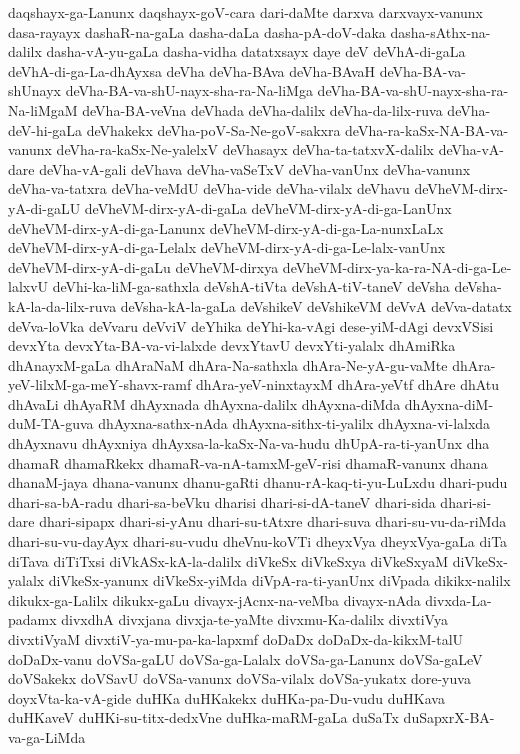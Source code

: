 {daqshayx-ga-Lanunx
daqshayx-goV-cara
dari-daMte
darxva
darxvayx-vanunx
dasa-rayayx
dashaR-na-gaLa
dasha-daLa
dasha-pA-doV-daka
dasha-sAthx-na-dalilx
dasha-vA-yu-gaLa
dasha-vidha
datatxsayx
daye
deV
deVhA-di-gaLa
deVhA-di-ga-La-dhAyxsa
deVha
deVha-BAva
deVha-BAvaH
deVha-BA-va-shUnayx
deVha-BA-va-shU-nayx-sha-ra-Na-liMga
deVha-BA-va-shU-nayx-sha-ra-Na-liMgaM
deVha-BA-veVna
deVhada
deVha-dalilx
deVha-da-lilx-ruva
deVha-deV-hi-gaLa
deVhakekx
deVha-poV-Sa-Ne-goV-sakxra
deVha-ra-kaSx-NA-BA-va-vanunx
deVha-ra-kaSx-Ne-yalelxV
deVhasayx
deVha-ta-tatxvX-dalilx
deVha-vA-dare
deVha-vA-gali
deVhava
deVha-vaSeTxV
deVha-vanUnx
deVha-vanunx
deVha-va-tatxra
deVha-veMdU
deVha-vide
deVha-vilalx
deVhavu
deVheVM-dirx-yA-di-gaLU
deVheVM-dirx-yA-di-gaLa
deVheVM-dirx-yA-di-ga-LanUnx
deVheVM-dirx-yA-di-ga-Lanunx
deVheVM-dirx-yA-di-ga-La-nunxLaLx
deVheVM-dirx-yA-di-ga-Lelalx
deVheVM-dirx-yA-di-ga-Le-lalx-vanUnx
deVheVM-dirx-yA-di-gaLu
deVheVM-dirxya
deVheVM-dirx-ya-ka-ra-NA-di-ga-Le-lalxvU
deVhi-ka-liM-ga-sathxla
deVshA-tiVta
deVshA-tiV-taneV
deVsha
deVsha-kA-la-da-lilx-ruva
deVsha-kA-la-gaLa
deVshikeV
deVshikeVM
deVvA
deVva-datatx
deVva-loVka
deVvaru
deVviV
deYhika
deYhi-ka-vAgi
dese-yiM-dAgi
devxVSisi
devxYta
devxYta-BA-va-vi-lalxde
devxYtavU
devxYti-yalalx
dhAmiRka
dhAnayxM-gaLa
dhAraNaM
dhAra-Na-sathxla
dhAra-Ne-yA-gu-vaMte
dhAra-yeV-lilxM-ga-meY-shavx-ramf
dhAra-yeV-ninxtayxM
dhAra-yeVtf
dhAre
dhAtu
dhAvaLi
dhAyaRM
dhAyxnada
dhAyxna-dalilx
dhAyxna-diMda
dhAyxna-diM-duM-TA-guva
dhAyxna-sathx-nAda
dhAyxna-sithx-ti-yalilx
dhAyxna-vi-lalxda
dhAyxnavu
dhAyxniya
dhAyxsa-la-kaSx-Na-va-hudu
dhUpA-ra-ti-yanUnx
dha
dhamaR
dhamaRkekx
dhamaR-va-nA-tamxM-geV-risi
dhamaR-vanunx
dhana
dhanaM-jaya
dhana-vanunx
dhanu-gaRti
dhanu-rA-kaq-ti-yu-LuLxdu
dhari-pudu
dhari-sa-bA-radu
dhari-sa-beVku
dharisi
dhari-si-dA-taneV
dhari-sida
dhari-si-dare
dhari-sipapx
dhari-si-yAnu
dhari-su-tAtxre
dhari-suva
dhari-su-vu-da-riMda
dhari-su-vu-dayAyx
dhari-su-vudu
dheVnu-koVTi
dheyxVya
dheyxVya-gaLa
diTa
diTava
diTiTxsi
diVkASx-kA-la-dalilx
diVkeSx
diVkeSxya
diVkeSxyaM
diVkeSx-yalalx
diVkeSx-yanunx
diVkeSx-yiMda
diVpA-ra-ti-yanUnx
diVpada
dikikx-nalilx
dikukx-ga-Lalilx
dikukx-gaLu
divayx-jAcnx-na-veMba
divayx-nAda
divxda-La-padamx
divxdhA
divxjana
divxja-te-yaMte
divxmu-Ka-dalilx
divxtiVya
divxtiVyaM
divxtiV-ya-mu-pa-ka-lapxmf
doDaDx
doDaDx-da-kikxM-talU
doDaDx-vanu
doVSa-gaLU
doVSa-ga-Lalalx
doVSa-ga-Lanunx
doVSa-gaLeV
doVSakekx
doVSavU
doVSa-vanunx
doVSa-vilalx
doVSa-yukatx
dore-yuva
doyxVta-ka-vA-gide
duHKa
duHKakekx
duHKa-pa-Du-vudu
duHKava
duHKaveV
duHKi-su-titx-dedxVne
duHka-maRM-gaLa
duSaTx
duSapxrX-BA-va-ga-LiMda
}
